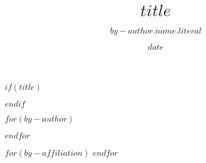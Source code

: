 $if(title)$
\title{$title$}
$endif$

$for(by-author)$
\author[%
$if(by-author.affiliations)$%
$for(by-author.affiliations)$$it.id$$sep$,$endfor$%
$endif$%
]{$by-author.name.literal$}
$endfor$

$for(by-affiliation)$
$endfor$

\date{$date$}
